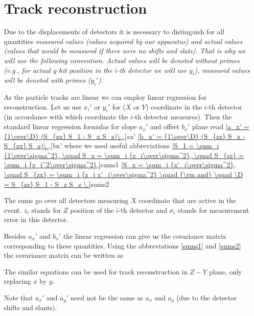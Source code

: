 \section{Track reconstruction}
Due to the displacements of detectors it is necessary to distinguish for all quantities \em{measured} values (values acquired by our apparatus) and \em{actual} values (values that would be measured if there were no shifts and slats). That is why we will use the following convention. Actual values will be denoted without primes (e.g., for actual $y$ hit position in the $i$-th detector we will use $y_i$), measured values will be denoted with primes ($y_i'$).

As the particle tracks are linear we can employ linear regression for reconstruction. Let us use $x_i'$ or $y_i'$ for ($X$ or $Y$) coordinate in the $i$-th detector (in accordance with which coordinate the $i$-th detector
measures). Then the standard linear regression formulas for slope $a_x'$ and offset $b_x'$  plane read
\eqref{a_x' = {1\over\D} (S_{zx} S_1 - S_x S_z)\ ,}{ax'}
\eqref{b_x' = {1\over\D} (S_{zz} S_x - S_{zx} S_z)\ ,}{bx'}
where we used useful abbreviations
\eqref{S_1 = \sum_i {1\over\sigma^2}, \quad S_z = \sum_i {z_i\over\sigma^2}, \quad S_{zz} = \sum_i {z_i^2\over\sigma^2},}{sums1}
\eqref{S_x = \sum_i {x'_i\over\sigma^2}, \quad S_{zx} = \sum_i {z_i x'_i\over\sigma^2} \quad {\rm and} \quad \D = S_{zz} S_1 - S_z S_z \.}{sums2}

The sums go over all detectors measuring $X$ coordinate that are active
in the event. $z_i$ stands for $Z$ position of the $i$-th detector and $\sigma_i$
stands for measurement error in this detector.

Besides $a_x'$ and $b_x'$ the linear regression can give us the covariance matrix
corresponding to these quantities. Using the abbreviations \ref{sums1} and \ref{sums2} the
covariance matrix can be written as

The similar equations can be used for track reconstruction in $Z-Y$ plane, only replacing
$x$ by $y$.

Note that $a_x'$ and $a_y'$ need not be the same as $a_x$ and $a_y$ (due to the detector
shifts and slants).





